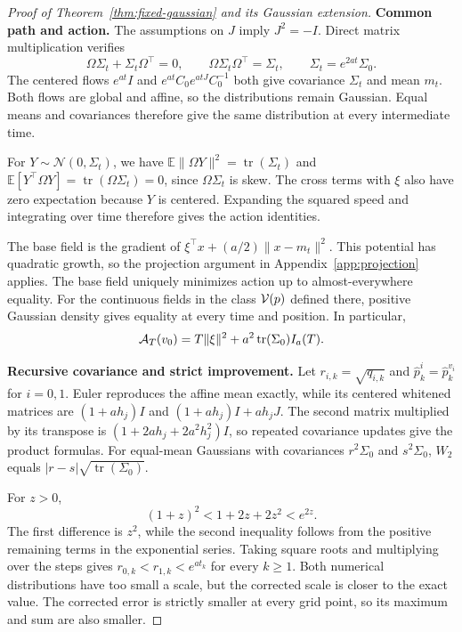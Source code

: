 \begin{proof}[Proof of Theorem~\ref{thm:fixed-gaussian} and its Gaussian extension]
\label{proof:fixed-gaussian}
\textbf{Common path and action.}\quad
The assumptions on $J$ imply $J^2=-I$. Direct matrix multiplication verifies
\[
 \Omega\Sigma_t+\Sigma_t\Omega^\top=0,\qquad
 \Omega\Sigma_t\Omega^\top=\Sigma_t,\qquad \Sigma_t=e^{2at}\Sigma_0.
\]
The centered flows $e^{at}I$ and $e^{at}C_0e^{atJ}C_0^{-1}$ both give covariance $\Sigma_t$ and mean $m_t$. Both flows are global and affine, so the distributions remain Gaussian. Equal means and covariances therefore give the same distribution at every intermediate time.

For $Y\sim\mathcal N(0,\Sigma_t)$, we have $\mathbb E\|\Omega Y\|^2=\operatorname{tr}(\Sigma_t)$ and $\mathbb E[Y^\top \Omega Y]=\operatorname{tr}(\Omega\Sigma_t)=0$, since $\Omega\Sigma_t$ is skew. The cross terms with $\xi$ also have zero expectation because $Y$ is centered. Expanding the squared speed and integrating over time therefore gives the action identities.

The base field is the gradient of $\xi^\top x+(a/2)\|x-m_t\|^2$. This potential has quadratic growth, so the projection argument in Appendix~\ref{app:projection} applies. The base field uniquely minimizes action up to almost-everywhere equality. For the continuous fields in the class $\mathcal V(p)$ defined there, positive Gaussian density gives equality at every time and position. In particular,
\[
 \mathcal A_T(v_0)=T\|\xi\|^2+a^2\operatorname{tr}(\Sigma_0)I_a(T).
\]

\textbf{Recursive covariance and strict improvement.}\quad
Let $r_{i,k}=\sqrt{q_{i,k}}$ and $\widehat p_k^i=\widehat p_k^{v_i}$ for $i=0,1$. Euler reproduces the affine mean exactly, while its centered whitened matrices are $(1+ah_j)I$ and $(1+ah_j)I+ah_jJ$. The second matrix multiplied by its transpose is $(1+2ah_j+2a^2h_j^2)I$, so repeated covariance updates give the product formulas. For equal-mean Gaussians with covariances $r^2\Sigma_0$ and $s^2\Sigma_0$, $W_2$ equals $|r-s|\sqrt{\operatorname{tr}(\Sigma_0)}$.

For $z>0$,
\[
 (1+z)^2<1+2z+2z^2<e^{2z}.
\]
The first difference is $z^2$, while the second inequality follows from the positive remaining terms in the exponential series. Taking square roots and multiplying over the steps gives $r_{0,k}<r_{1,k}<e^{at_k}$ for every $k\ge1$. Both numerical distributions have too small a scale, but the corrected scale is closer to the exact value. The corrected error is strictly smaller at every grid point, so its maximum and sum are also smaller.


\end{proof}

